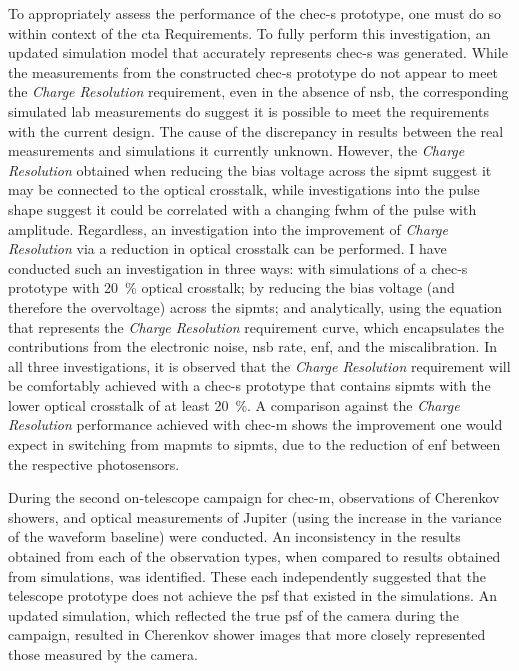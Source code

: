To appropriately assess the performance of the \gls{chec-s} prototype, one must do so within context of the \gls{cta} Requirements. To fully perform this investigation, an updated simulation model that accurately represents \gls{chec-s} was generated. While the measurements from the constructed \gls{chec-s} prototype do not appear to meet the \textit{Charge Resolution} requirement, even in the absence of \gls{nsb}, the corresponding simulated lab measurements do suggest it is possible to meet the requirements with the current design. The cause of the discrepancy in results between the real measurements and simulations it currently unknown. However, the \textit{Charge Resolution} obtained when reducing the bias voltage across the \gls{sipmt} suggest it may be connected to the optical crosstalk, while investigations into the pulse shape suggest it could be correlated with a changing \gls{fwhm} of the pulse with amplitude. Regardless, an investigation into the improvement of \textit{Charge Resolution} via a reduction in optical crosstalk can be performed. I have conducted such an investigation in three ways: with simulations of a \gls{chec-s} prototype with \SI{20}{\percent} optical crosstalk; by reducing the bias voltage (and therefore the overvoltage) across the \glspl{sipmt}; and analytically, using the equation that represents the \textit{Charge Resolution} requirement curve, which encapsulates the contributions from the electronic noise, \gls{nsb} rate, \gls{enf}, and the miscalibration. In all three investigations, it is observed that the \textit{Charge Resolution} requirement will be comfortably achieved with a \gls{chec-s} prototype that contains \glspl{sipmt} with the lower optical crosstalk of at least \SI{20}{\percent}. A comparison against the \textit{Charge Resolution} performance achieved with \gls{chec-m} shows the improvement one would expect in switching from \glspl{mapmt} to \glspl{sipmt}, due to the reduction of \gls{enf} between the respective photosensors.

During the second on-telescope campaign for \gls{chec-m}, observations of Cherenkov showers, and optical measurements of Jupiter (using the increase in the variance of the waveform baseline) were conducted. An inconsistency in the results obtained from each of the observation types, when compared to results obtained from simulations, was identified. These each independently suggested that the telescope prototype does not achieve the \gls{psf} that existed in the simulations. An updated simulation, which reflected the true \gls{psf} of the camera during the campaign, resulted in Cherenkov shower images that more closely represented those measured by the camera. 
 
